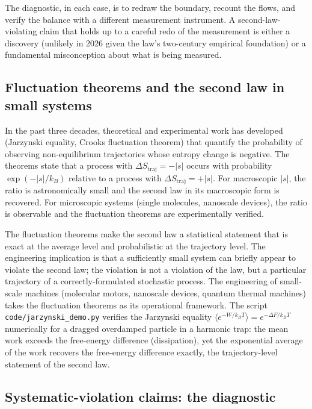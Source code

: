 The diagnostic, in each case, is to redraw the boundary, recount the
flows, and verify the balance with a different measurement instrument.
A second-law-violating claim that holds up to a careful redo of the
measurement is either a discovery (unlikely in 2026 given the law's
two-century empirical foundation) or a fundamental misconception
about what is being measured.

\subsection{Fluctuation theorems and the second law in small systems}

In the past three decades, theoretical and experimental work has
developed  (Jarzynski equality, Crooks
fluctuation theorem) that quantify the probability of observing
non-equilibrium trajectories whose entropy change is negative. The
theorems state that a process with $\Delta S_{\text{traj}} = -|s|$
occurs with probability $\exp(-|s|/k_B)$ relative to a process with
$\Delta S_{\text{traj}} = +|s|$. For macroscopic $|s|$, the ratio is
astronomically small and the second law in its macroscopic form is
recovered. For microscopic systems (single molecules, nanoscale
devices), the ratio is observable and the fluctuation theorems are
experimentally verified.

The fluctuation theorems make the second law a statistical statement
that is exact at the average level and probabilistic at the trajectory
level. The engineering implication is that a sufficiently small
system can briefly appear to violate the second law; the violation
is not a violation of the law, but a particular trajectory of a
correctly-formulated stochastic process. The engineering of small-
scale machines (molecular motors, nanoscale devices, quantum thermal
machines) takes the fluctuation theorems as its operational
framework. The script \texttt{code/jarzynski\_demo.py} verifies the
Jarzynski equality $\langle e^{-W/k_B T}\rangle = e^{-\Delta F/k_B T}$
numerically for a dragged overdamped particle in a harmonic trap: the
mean work exceeds the free-energy difference (dissipation), yet the
exponential average of the work recovers the free-energy difference
exactly, the trajectory-level statement of the second law.

\subsection{Systematic-violation claims: the diagnostic}

